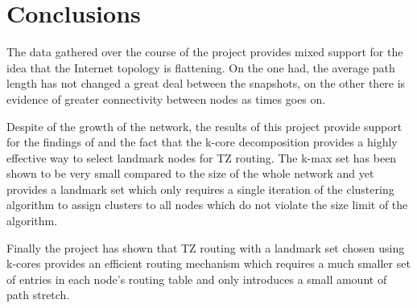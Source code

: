 \documentclass{mpaper}
\begin{document}
\section{Conclusions}
The data gathered over the course of the project provides mixed support for the idea that the Internet topology is flattening. On the one had, the average path length has not changed a great deal between the snapshots, on the other there is evidence of greater connectivity between nodes as times goes on. 

Despite of the growth of the network, the results of this project provide support for the findings of \cite{strowes} and the fact that the k-core decomposition provides a highly effective way to select landmark nodes for TZ routing. The k-max set has been shown to be very small compared to the size of the whole network and yet provides a landmark set which only requires a single iteration of the clustering algorithm to assign clusters to all nodes which do not violate the size limit of the algorithm. 

Finally the project has shown that TZ routing with a landmark set chosen using k-cores provides an efficient routing mechanism which requires a much smaller set of entries in each node's routing table and only introduces a small amount of path stretch. \newline

\newpage


\end{document}
